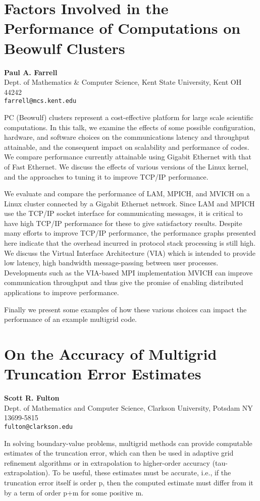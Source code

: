 \documentclass[11pt]{article}
\newcommand{\nextab}[4]{
	\section{#2}
	{\bf #1} \\ \nopagebreak
	{#3} \\ \nopagebreak
	{\tt #4} \nopagebreak
	}
\begin{document}

\nextab
{Paul A. Farrell}
{Factors Involved in the Performance of Computations on Beowulf Clusters}
{Dept. of Mathematics \& Computer Science,
Kent State University, Kent OH 44242}
{farrell@mcs.kent.edu}


PC (Beowulf) clusters represent a cost-effective platform
for large scale scientific computations. In this talk,
we examine the effects of some possible configuration,
hardware, and software choices on
the communications latency and throughput attainable, and the consequent
impact on scalability and performance of codes.
We compare performance currently attainable using Gigabit Ethernet with
that of Fast Ethernet.
We discuss the effects of various versions of the Linux kernel,
and the approaches to tuning it to improve TCP/IP performance.


We evaluate and compare the performance of LAM, MPICH, and MVICH on a
Linux cluster connected by a Gigabit Ethernet network.
Since LAM and MPICH use the
TCP/IP socket interface for communicating messages, it is critical to
have high TCP/IP performance for these to give satisfactory results.
Despite many efforts to improve TCP/IP
performance, the performance graphs presented here indicate that the
overhead incurred in protocol stack processing is still high.
We discuss the Virtual Interface Architecture (VIA) which is intended to
provide low latency, high bandwidth message-passing between user processes.
Developments such as the VIA-based MPI implementation MVICH can improve
communication throughput and thus give the promise of enabling
distributed applications to improve performance.

Finally we present some examples of how these various choices can
impact the performance of an example multigrid code.





\nextab
{Scott R. Fulton}
{On the Accuracy of Multigrid Truncation Error Estimates}
{Dept. of Mathematics and Computer Science,
Clarkson University, Potsdam NY 13699-5815}
{fulton@clarkson.edu}


In solving boundary-value problems, multigrid methods can provide
computable estimates of the truncation error, which can then be used in
adaptive grid refinement algorithms or in extrapolation to higher-order
accuracy (tau-extrapolation).  To be useful, these estimates must be
accurate, i.e., if the truncation error itself is order p, then the
computed estimate must differ from it by a term of order p+m for some
positive m.
\end{document}
